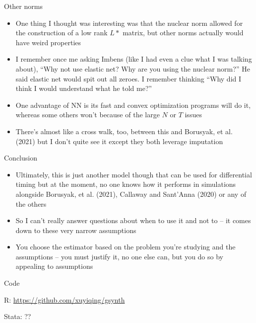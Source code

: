 \documentclass{beamer}
\begin{document}
\begin{frame}{Other norms}

\begin{itemize}
\item One thing I thought was interesting was that the nuclear norm allowed for the construction of a low rank $L*$ matrix, but other norms actually would have weird properties
\item I remember once me asking Imbens (like I had even a clue what I was talking about), ``Why not use elastic net?  Why are you using the nuclear norm?'' He said elastic net would spit out all zeroes.  I remember thinking ``Why did I think I would understand what he told me?''
\item One advantage of NN is its fast and convex optimization programs will do it, whereas some others won't because of the large $N$ or $T$ issues
\item There's almost like a cross walk, too, between this and Borusyak, et al. (2021) but I don't quite see it except they both leverage imputation
\end{itemize}
\end{frame}

\begin{frame}{Conclusion}

\begin{itemize}
\item Ultimately, this is just another model though that can be used for differential timing but at the moment, no one knows how it performs in simulations alongside Borusyak, et al. (2021), Callaway and Sant'Anna (2020) or any of the others
\item So I can't really answer questions about when to use it and not to -- it comes down to these very narrow assumptions
\item You choose the estimator based on the problem you're studying and the assumptions -- you must justify it, no one else can, but you do so by appealing to assumptions
\end{itemize}

\end{frame}

\begin{frame}{Code}

R: \url{https://github.com/xuyiqing/gsynth}

\bigskip

Stata: ??

\end{frame}
\end{document}
